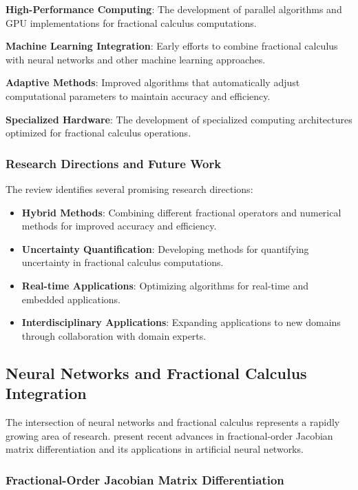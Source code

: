 \textbf{High-Performance Computing}: The development of parallel algorithms and GPU implementations for fractional calculus computations.

\textbf{Machine Learning Integration}: Early efforts to combine fractional calculus with neural networks and other machine learning approaches.

\textbf{Adaptive Methods}: Improved algorithms that automatically adjust computational parameters to maintain accuracy and efficiency.

\textbf{Specialized Hardware}: The development of specialized computing architectures optimized for fractional calculus operations.

\subsubsection{Research Directions and Future Work}

The review identifies several promising research directions:

\begin{itemize}
    \item \textbf{Hybrid Methods}: Combining different fractional operators and numerical methods for improved accuracy and efficiency.
    \item \textbf{Uncertainty Quantification}: Developing methods for quantifying uncertainty in fractional calculus computations.
    \item \textbf{Real-time Applications}: Optimizing algorithms for real-time and embedded applications.
    \item \textbf{Interdisciplinary Applications}: Expanding applications to new domains through collaboration with domain experts.
\end{itemize}

\subsection{Neural Networks and Fractional Calculus Integration}

The intersection of neural networks and fractional calculus represents a rapidly growing area of research. \citet{Zhou2025FractionalOrderJacobianANN} present recent advances in fractional-order Jacobian matrix differentiation and its applications in artificial neural networks.

\subsubsection{Fractional-Order Jacobian Matrix Differentiation}

